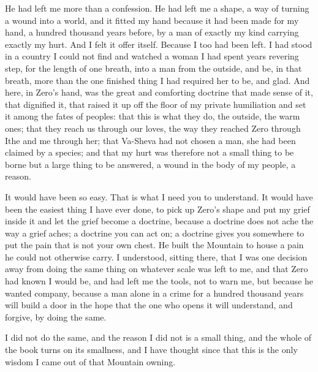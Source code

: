 He had left me more than a confession. He had left me a shape, a way of turning a wound into a world, and it fitted my hand because it had been made for my hand, a hundred thousand years before, by a man of exactly my kind carrying exactly my hurt. And I felt it offer itself. Because I too had been left. I had stood in a country I could not find and watched a woman I had spent years revering step, for the length of one breath, into a man from the outside, and be, in that breath, more than the one finished thing I had required her to be, and glad. And here, in Zero's hand, was the great and comforting doctrine that made sense of it, that dignified it, that raised it up off the floor of my private humiliation and set it among the fates of peoples: that this is what they do, the outside, the warm ones; that they reach us through our loves, the way they reached Zero through Ithe and me through her; that Va-Sheva had not chosen a man, she had been claimed by a species; and that my hurt was therefore not a small thing to be borne but a large thing to be answered, a wound in the body of my people, a reason.\par

It would have been so easy. That is what I need you to understand. It would have been the easiest thing I have ever done, to pick up Zero's shape and put my grief inside it and let the grief become a doctrine, because a doctrine does not ache the way a grief aches; a doctrine you can act on; a doctrine gives you somewhere to put the pain that is not your own chest. He built the Mountain to house a pain he could not otherwise carry. I understood, sitting there, that I was one decision away from doing the same thing on whatever scale was left to me, and that Zero had known I would be, and had left me the tools, not to warn me, but because he wanted company, because a man alone in a crime for a hundred thousand years will build a door in the hope that the one who opens it will understand, and forgive, by doing the same.\par

\ornament

I did not do the same, and the reason I did not is a small thing, and the whole of the book turns on its smallness, and I have thought since that this is the only wisdom I came out of that Mountain owning.\par

